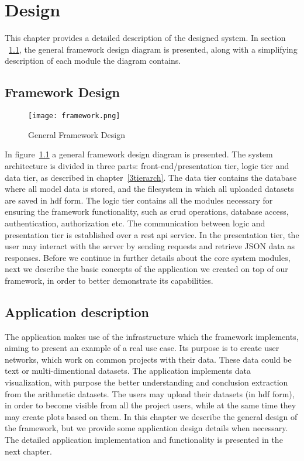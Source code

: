 
\chapter{Design} %

This chapter provides a detailed description of the designed system. In section ~\ref{gfd}, the general framework design diagram is presented, along with a simplifying description of each module the diagram contains. 


\section{Framework Design}
\label{gfd}
\begin{figure}
	\centerline{\texttt{[image: framework.png]}}
	\caption{General Framework Design}
	\label{framework}
\end{figure}
In figure~\ref{framework} a general framework design diagram is presented. The system architecture is divided in three parts: front-end/presentation tier, logic tier and data tier, as described in chapter~\ref{3tierarch}. The data tier contains the database where all model data is stored, and the filesystem in which all uploaded datasets are saved in hdf form. The logic tier contains all the modules necessary for ensuring the framework functionality, such as crud operations, database access, authentication, authorization etc. The communication between logic and presentation tier is established over a rest api service. In the presentation tier, the user may interact with the server by sending requests and retrieve JSON data as responses. Before we continue in further details about the core system modules, next we describe the basic concepts of the application we created on top of our framework, in order to better demonstrate its capabilities.

\section{Application description}
The application makes use of the infrastructure which the framework implements, aiming to present an example of a real use case. Its purpose is to create user networks, which work on common projects with their data. These data could be text or multi-dimentional datasets. The application implements data visualization, with purpose the better understanding and conclusion extraction from the arithmetic datasets. The users may upload their datasets (in hdf form), in order to become visible from all the project users, while at the same time they may create plots based on them. In this chapter we describe the general design of the framework, but we provide some application design details when necessary. The detailed application implementation and functionality is presented in the next chapter.

